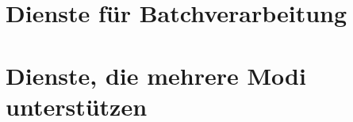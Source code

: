 

\section{Dienste für Batchverarbeitung}\label{section:Dienste-für-Batchverarbeitun}



\section{Dienste, die mehrere Modi unterstützen}\label{section:Dienste-die-mehrere-Modi-unterstütze}



